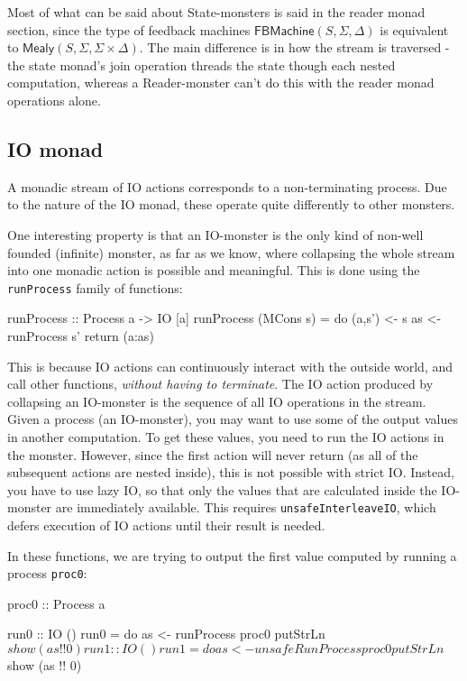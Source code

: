 \documentclass{article}
\begin{document}
Most of what can be said about State-monsters is said in the reader monad section, since the type of feedback machines $\mathsf{FBMachine}(S,\Sigma,\Delta)$ is equivalent to $\mathsf{Mealy}(S,\Sigma,\Sigma \times \Delta)$. The main difference is in how the stream is traversed - the state monad's join operation threads the state though each nested computation, whereas a Reader-monster can't do this with the reader monad operations alone.

\subsection{IO monad}

A monadic stream of IO actions corresponds to a non-terminating process. Due to the nature of the IO monad, these operate quite differently to other monsters.

One interesting property is that an IO-monster is the only kind of non-well founded (infinite) monster, as far as we know, where collapsing the whole stream into one monadic action is possible and meaningful. This is done using the \verb+runProcess+ family of functions:

\begin{haskell}
runProcess :: Process a -> IO [a]
runProcess (MCons s) = do (a,s') <- s
                          as     <- runProcess s'
                          return (a:as)
\end{haskell}

This is because IO actions can continuously interact with the outside world, and call other functions, \emph{without having to terminate}. The IO action produced by collapsing an IO-monster is the sequence of all IO operations in the stream. \\

Given a process (an IO-monster), you may want to use some of the output values in another computation. To get these values, you need to run the IO actions in the monster. However, since the first action will never return (as all of the subsequent actions are nested inside), this is not possible with strict IO. Instead, you have to use lazy IO, so that only the values that are calculated inside the IO-monster are immediately available. This requires \verb+unsafeInterleaveIO+, which defers execution of IO actions until their result is needed. 

In these functions, we are trying to output the first value computed by running a process \verb+proc0+:

\begin{haskell}
proc0 :: Process a

run0 :: IO ()
run0 = do as <- runProcess proc0
          putStrLn $ show (as !! 0)

run1 :: IO ()
run1 = do as <- unsafeRunProcess proc0
          putStrLn $ show (as !! 0)
\end{haskell}
\end{document}
